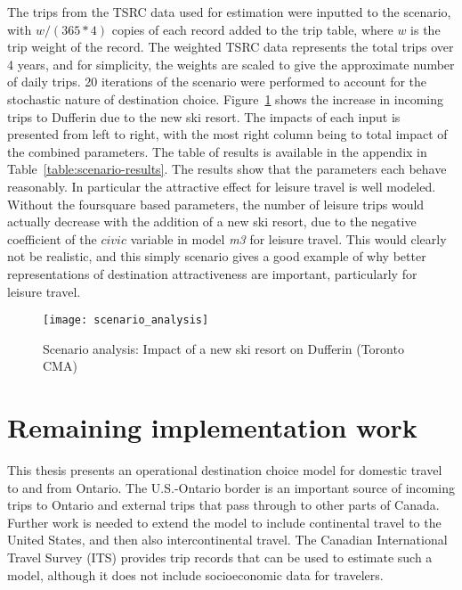 The trips from the TSRC data used for estimation were inputted to the scenario, with $w/(365*4)$ copies of each record added to the trip table, where $w$ is the trip weight of the record. The weighted TSRC data represents the total trips over 4 years, and for simplicity, the weights are scaled to give the approximate number of daily trips. 20 iterations of the scenario were performed to account for the stochastic nature of destination choice. Figure~\ref{fig:scenario-results} shows the increase in incoming trips to Dufferin due to the new ski resort. The impacts of each input is presented from left to right, with the most right column being to total impact of the combined parameters. The table of results is available in the appendix in Table~\ref{table:scenario-results}. The results show that the parameters each behave reasonably. In particular the attractive effect for leisure travel is well modeled. Without the foursquare based parameters, the number of leisure trips would actually decrease with the addition of a new ski resort, due to the negative coefficient of the $civic$ variable in model \textit{m3} for leisure travel. This would clearly not be realistic, and this simply scenario gives a good example of why better representations of destination attractiveness are important, particularly for leisure travel.

\begin{figure}[H]
\centering
\texttt{[image: scenario\_analysis]}
\caption{Scenario analysis: Impact of a new ski resort on Dufferin (Toronto CMA)}
\label{fig:scenario-results}
\end{figure}


\section{Remaining implementation work}
This thesis presents an operational destination choice model for domestic travel to and from Ontario. The U.S.-Ontario border is an important source of incoming trips to Ontario and external trips that pass through to other parts of Canada. Further work is needed to extend the model to include continental travel to the United States, and then also intercontinental travel. The Canadian International Travel Survey (ITS) provides trip records that can be used to estimate such a model, although it does not include socioeconomic data for travelers. 

